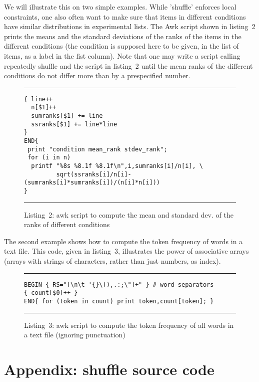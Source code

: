 \documentclass[doc]{apa}
\begin{document}
We will illustrate this on two simple examples. While 'shuffle' enforces
local constraints, one also often want to make sure that items in
different conditions have similar distributions in experimental lists.
The Awk script shown in listing~2 prints the means and the standard
deviations of the ranks of the items in the different conditions (the
condition is supposed here to be given, in the list of items, as a
label in the fist column). Note that one may write a script calling
repeatedly shuffle and the script in listing~2 until the mean ranks of
the different conditions do not differ more than by a prespecified
number.

\begin{figure}[htb]
\caption{Listing~2: awk script to compute the mean and standard dev. 
of the ranks of different conditions}
\hrule\vspace*{4pt}
\begin{verbatim}
{ line++
  n[$1]++  
  sumranks[$1] += line
  ssranks[$1] += line*line
}
END{ 
 print "condition mean_rank stdev_rank";
 for (i in n)  
  printf "%8s %8.1f %8.1f\n",i,sumranks[i]/n[i], \
         sqrt(ssranks[i]/n[i]-(sumranks[i]*sumranks[i])/(n[i]*n[i])) 
}
\end{verbatim}
\hrule
\end{figure}

The second example shows how to compute the token frequency of words
in a text file. This code, given in listing~3, illustrates the power
of associative arrays (arrays with strings of characters, rather than
just numbers, as index).

\begin{figure}[htb]
\caption{Listing~3: awk script to compute the token frequency of all words in a text file (ignoring punctuation)}
\hrule\vspace*{4pt}
\begin{verbatim}
BEGIN { RS="[\n\t '{}\(),.:;\"]+" } # word separators 
{ count[$0]++ }
END{ for (token in count) print token,count[token]; } 
\end{verbatim}
\hrule
\end{figure}
 




\newpage
\section*{Appendix: shuffle source code}

\end{document}
